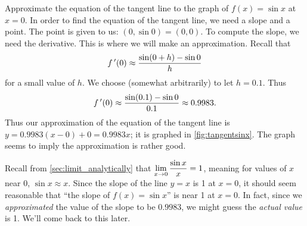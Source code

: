 \begin{example}\label{ex_der_num_approx}%
Approximate the equation of the tangent line to the graph of $f(x)=\sin x$ at $x=0$.
\solution
In order to find the equation of the tangent line, we need a slope and a point. The point is given to us: $(0,\sin 0) = (0,0)$. To compute the slope, we need the derivative. This is where we will make an approximation. Recall that
\[f\,'(0) \approx \frac{\sin(0+h)- \sin 0}{h}\]
for a small value of $h$. We choose (somewhat arbitrarily) to let $h=0.1$. Thus
%
%
\[f\,'(0) \approx \frac{\sin(0.1)-\sin 0}{0.1} \approx 0.9983.\]
Thus our approximation of the equation of the tangent line is $y = 0.9983(x-0) +0 = 0.9983x$; it is graphed in \autoref{fig:tangentsinx}. The graph seems to imply the approximation is rather good.
\end{example}

Recall from \autoref{sec:limit_analytically} that $\displaystyle \lim_{x\to 0}\frac{\sin x}x =1$, meaning for values of $x$ near 0, $\sin x \approx x$. Since the slope of the line $y=x$ is 1 at $x=0$, it should seem reasonable that ``the slope of $f(x)=\sin x$'' is near 1 at $x=0$. In fact, since we \emph{approximated} the value of the slope to be $0.9983$, we might guess the \emph{actual value} is 1. We'll come back to this later.\bigskip


